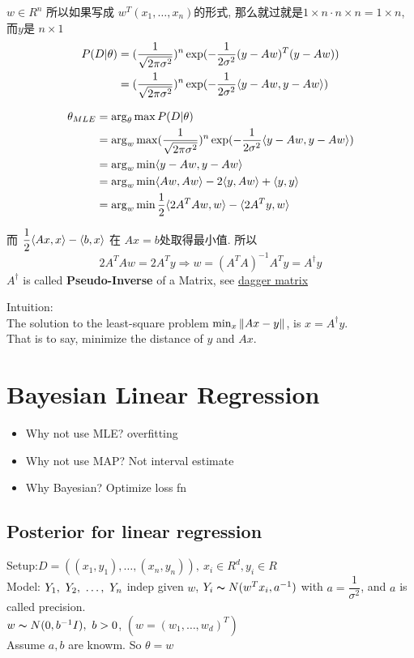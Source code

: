 \documentclass{article}
\begin{document}
$w \in R^n$
所以如果写成 $w^T (x_1, \ldots, x_n)$的形式, 
那么就过就是$1 \times n \cdot n \times n = 1 \times n$, 而$y$是 $n \times 1$
$$
\begin{aligned}
P(D|\theta) 
& = (\dfrac{1}{\sqrt{2\pi \sigma^2}})^n \exp(- \dfrac{1}{2\sigma^2} (y - Aw)^T (y - Aw)) \\
& = (\dfrac{1}{\sqrt{2\pi \sigma^2}})^n \exp(- \dfrac{1}{2\sigma^2} \langle y - Aw , y - Aw\rangle) \\
\end{aligned}
$$

$$
\begin{aligned}
\theta_{MLE} 
& = \arg_\theta \max P(D|\theta) \\
& = \arg_w \max (\dfrac{1}{\sqrt{2\pi \sigma^2}})^n \exp(- \dfrac{1}{2\sigma^2} \langle y - Aw , y - Aw\rangle) \\
& = \arg_w \min \langle y - Aw , y - Aw\rangle \\
& = \arg_w \min \langle Aw , Aw\rangle - 2\langle y , Aw\rangle + \langle y , y\rangle \\
& = \arg_w \min \dfrac{1}{2}\langle 2 A^T A w , w\rangle - \langle 2 A^T y , w\rangle \\
\end{aligned}
$$

而 $\dfrac{1}{2} \langle Ax , x\rangle - \langle b , x\rangle$ 在 $Ax = b$处取得最小值. 所以
$$ 2 A^T A w = 2 A^T y \Rightarrow w = (A^T A)^{-1} A^T y = A^{\dagger} y $$
$A^\dagger$ is called \textbf{Pseudo-Inverse} of a Matrix, 
see \href{https://inst.eecs.berkeley.edu/~ee127a/book/login/def\_pseudo\_inv.html}{dagger matrix}

Intuition: \\
The solution to the least-square problem $\min_x \left\Vert Ax - y\right\Vert$, is $x = A^\dagger y$.\\
That is to say, minimize the distance of $y$ and $Ax$.

\section{Bayesian Linear Regression}
\begin{itemize}
\item Why not use MLE? overfitting
\item Why not use MAP? Not interval estimate
\item Why Bayesian? Optimize loss fn
\end{itemize}

\subsection{Posterior for linear regression}
Setup:$D = ((x_1, y_1), \ldots, (x_n,y_n)),\ x_i \in R^d, y_i \in R$\\
Model: $Y_1,~Y_2,~\ldots,~Y_n$ indep given $w$, $Y_i \thicksim{N}(w^T x_i, a^{-1})$ with $a = \dfrac{1}{\sigma^2}$, and $a$ is called precision.\\
$w \thicksim{N}(0, b^{-1}I),\ b > 0$, $(w = (w_1, \ldots, w_d)^T)$\\
Assume $a, b$ are knowm. So $\theta = w$
\end{document}
